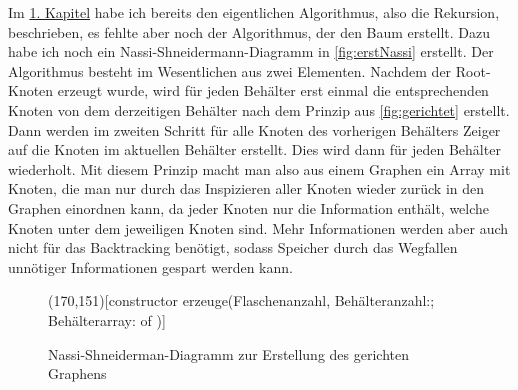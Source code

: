 \documentclass[10pt,a4paper]{scrartcl}
\begin{document}
Im \hyperlink{section.1}{1. Kapitel} habe ich bereits den eigentlichen Algorithmus, also die Rekursion, beschrieben, es fehlte aber noch der Algorithmus, der den Baum erstellt. Dazu habe ich noch ein Nassi-Shneidermann-Diagramm in \autoref{fig:erstNassi} erstellt. Der Algorithmus besteht im Wesentlichen aus zwei Elementen. Nachdem der Root-Knoten erzeugt wurde, wird für jeden Behälter erst einmal die entsprechenden Knoten von dem derzeitigen Behälter nach dem Prinzip aus \autoref{fig:gerichtet} erstellt. Dann werden im zweiten Schritt für alle Knoten des vorherigen Behälters Zeiger auf die Knoten im aktuellen Behälter erstellt. Dies wird dann für jeden Behälter wiederholt. Mit diesem Prinzip macht man also aus einem Graphen ein Array mit Knoten, die man nur durch das Inspizieren aller Knoten wieder zurück in den Graphen einordnen kann, da jeder Knoten nur die Information enthält, welche Knoten unter dem jeweiligen Knoten sind. Mehr Informationen werden aber auch nicht für das \glqq{}Backtracking\grqq{} benötigt, sodass Speicher durch das Wegfallen unnötiger Informationen gespart werden kann.

\begin{figure}[!hbtp]%
  \caption{Nassi-Shneiderman-Diagramm zur Erstellung des gerichten Graphens}
  \label{fig:erstNassi}
	\begin{centernss}
		\begin{struktogramm}(170,151)[constructor erzeuge(Flaschenanzahl, Behälteranzahl:; Behälterarray:  of )]
			\renewcommand{\pLanguage}{Pascal}
			\assign%
			{
			\begin{declaration}
			\end{declaration}
			}
		\dfr
			\dfr
			\dfrend
			\dfr
				\dfr
				\dfrend
			\dfrend
		\dfrend
		\end{struktogramm}
	\end{centernss}
\end{figure}
\end{document}
